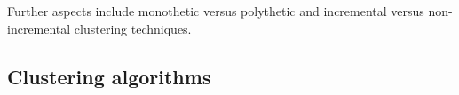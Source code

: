 Further aspects include monothetic versus polythetic and incremental versus non-incremental clustering techniques. 


\subsection{Clustering algorithms}





































